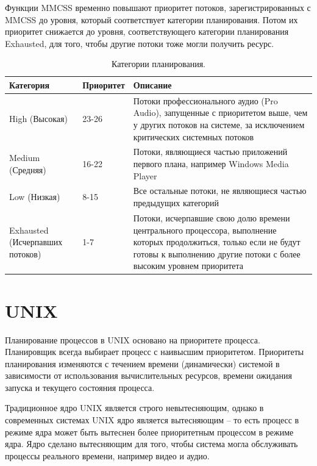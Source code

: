 Функции MMCSS временно повышают приоритет потоков, зарегистрированных с MMCSS до уровня, который соответствует категории планирования. Потом их приоритет снижается до уровня, соответствующего категории планирования Exhausted, для того, чтобы другие потоки тоже могли получить ресурс.
\begin{table}[h]
	\begin{center}
		\captionsetup{justification=raggedright,singlelinecheck=off,margin=2mm}
		\caption{Категории планирования.}
		\captionsetup{justification=raggedright,singlelinecheck=off,margin=2mm}
		\begin{tabular}{|p{40mm}|p{30mm}|p{80mm}|}
			\hline
			\textbf{Категория} & \textbf{Приоритет} & \textbf{Описание} \\
			\hline
			High (Высокая) & 23-26 & Потоки профессионального аудио (Pro Audio), запущенные с приоритетом выше, чем у других потоков на системе, за исключением критических системных потоков \\
			\hline
			Medium (Средняя) & 16-22 & Потоки, являющиеся частью приложений первого плана, например Windows Media Player \\
			\hline
			Low (Низкая) & 8-15 & Все остальные потоки, не являющиеся частью предыдущих категорий \\
			\hline
			Exhausted (Исчерпавших потоков) & 1-7 & Потоки, исчерпавшие свою долю времени центрального процессора, выполнение которых продолжиться, только если не будут готовы к выполнению другие потоки с более высоким уровнем приоритета \\
			\hline
		\end{tabular}
	\end{center}
	\label{tab:plan}
\end{table}
\section{UNIX}

Планирование процессов в UNIX основано на приоритете процесса. Планировщик всегда выбирает процесс с наивысшим приоритетом. Приоритеты планирования изменяются с течением времени (динамически) системой в зависимости от использования вычислительных ресурсов, времени ожидания запуска и текущего состояния процесса. 

Традиционное ядро UNIX является строго невытесняющим, однако в современных системах UNIX ядро является вытесняющим -- то есть процесс в режиме ядра может быть вытеснен более приоритетным процессом в режиме ядра. Ядро сделано вытесняющим для того, чтобы система могла обслуживать процессы реального времени, например видео и аудио.

